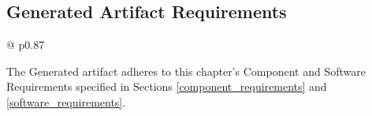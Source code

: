 \subsection{Generated Artifact Requirements}

\begin{table}[H]
    \begin{tabular}{@{\makebox[2em][c]{\rownumber\space}}  p{0.87\linewidth}}
        \\ 
    \hline

    The Generated artifact adheres to this chapter's Component and Software
    Requirements specified in Sections \ref{component_requirements} and
    \ref{software_requirements}. \\

    \hline
    \end{tabular}
\caption{The Generated Artifact Requirements}
\label{table_requirements_generated}
\end{table}